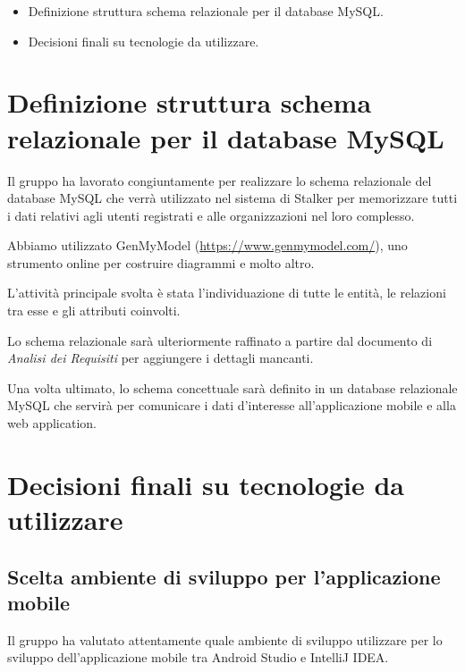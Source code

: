\documentclass{article}
\begin{document}
\begin{itemize}
  \item Definizione struttura schema relazionale per il database MySQL\@.
  \item Decisioni finali su tecnologie da utilizzare.
\end{itemize}

\section{Definizione struttura schema relazionale per il database MySQL}%
\label{sec:definizione_struttura_schema_relazionale_per_il_database_MySQL}
Il gruppo ha lavorato congiuntamente per realizzare lo schema relazionale del database MySQL che verrà utilizzato nel sistema di Stalker per memorizzare tutti i dati relativi agli utenti registrati e alle organizzazioni nel loro complesso.

Abbiamo utilizzato GenMyModel (\href{https://www.genmymodel.com/}{https://www.genmymodel.com/}), uno strumento online per costruire diagrammi e molto altro.

L'attività principale svolta è stata l'individuazione di tutte le entità, le relazioni tra esse e gli attributi coinvolti.

Lo schema relazionale sarà ulteriormente raffinato a partire dal documento di \textit{Analisi dei Requisiti} per aggiungere i dettagli mancanti.

Una volta ultimato, lo schema concettuale sarà definito in un database relazionale MySQL che servirà per comunicare i dati d'interesse all'applicazione mobile e alla web application.


\section{Decisioni finali su tecnologie da utilizzare}%
\label{sec:decisioni_finali}

\subsection{Scelta ambiente di sviluppo per l'applicazione mobile}%
\label{sub:scelta_ambiente_di_sviluppo_per_applicazione_mobile}
Il gruppo ha valutato attentamente quale ambiente di sviluppo utilizzare per lo sviluppo dell'applicazione mobile tra Android Studio e IntelliJ IDEA\@.
\end{document}
